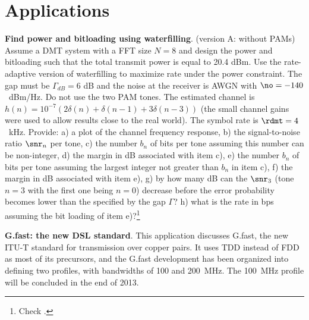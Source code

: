 %
%
%

\section{Applications}

\bApplication \textbf{Find power and bitloading using waterfilling}. (version A: without PAMs) Assume a DMT system with a FFT size $N=8$ and design the power and bitloading such that the total transmit power is equal to 20.4 dBm. Use the rate-adaptive version of waterfilling to maximize rate under the power constraint. The gap must be $\Gamma_{dB} = 6$ dB and the noise at the receiver is AWGN with $\no = -140$~dBm/Hz. Do not use the two PAM tones. The estimated channel is $h(n)=10^{-7} (2\delta(n) + \delta(n-1) + 3\delta(n-3))$ (the small channel gains were used to allow results close to the real world). The symbol rate is $\rdmt=4$~kHz. Provide: a) a plot of the channel frequency response, b) the signal-to-noise ratio $\snr_n$ per tone, c) the number $b_n$ of bits per tone assuming this number can be non-integer, d) the margin in dB associated with item c), e) the number $b_n$ of bits per tone assuming the largest integer not greater than $b_n$ in item c), f) the margin in dB associated with item e), g) by how many dB can the $\snr_3$ (tone $n=3$ with the first one being $n=0$) decrease before the error probability becomes lower than the specified by the gap $\Gamma$? h) what is the rate in bps assuming the bit loading of item e)?\footnote{Check .}

\eApplication




\bApplication \textbf{G.fast: the new DSL standard}.
This application discusses G.fast, the new ITU-T standard for transmission over copper pairs.
It uses TDD instead of FDD as most of its precursors, and the G.fast development has been organized into defining two profiles, with bandwidths of 100 and 200~MHz. The 100~MHz profile will be concluded in the end of 2013.

